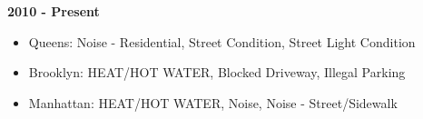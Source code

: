 \documentclass[sigconf]{acmart}
\begin{document}
\textbf{2010 - Present}
\begin{itemize}
    \item Queens: Noise - Residential, Street Condition, Street Light Condition
    \item Brooklyn: HEAT/HOT WATER, Blocked Driveway, Illegal Parking
    \item Manhattan: HEAT/HOT WATER, Noise, Noise - Street/Sidewalk
    
\end{itemize}



\end{document}
